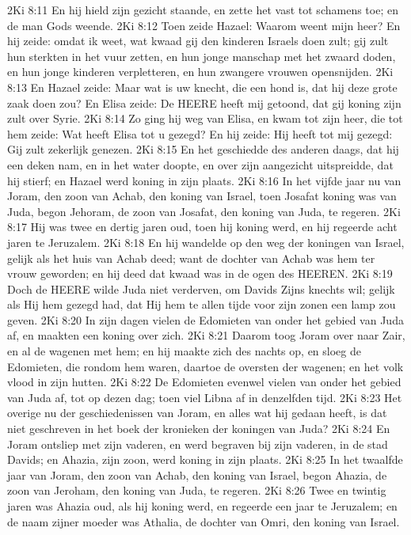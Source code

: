 2Ki 8:11  En hij hield zijn gezicht staande, en zette het vast tot schamens toe; en de man Gods weende.
2Ki 8:12  Toen zeide Hazael: Waarom weent mijn heer? En hij zeide: omdat ik weet, wat kwaad gij den kinderen Israels doen zult; gij zult hun sterkten in het vuur zetten, en hun jonge manschap met het zwaard doden, en hun jonge kinderen verpletteren, en hun zwangere vrouwen opensnijden.
2Ki 8:13  En Hazael zeide: Maar wat is uw knecht, die een hond is, dat hij deze grote zaak doen zou? En Elisa zeide: De HEERE heeft mij getoond, dat gij koning zijn zult over Syrie.
2Ki 8:14  Zo ging hij weg van Elisa, en kwam tot zijn heer, die tot hem zeide: Wat heeft Elisa tot u gezegd? En hij zeide: Hij heeft tot mij gezegd: Gij zult zekerlijk genezen.
2Ki 8:15  En het geschiedde des anderen daags, dat hij een deken nam, en in het water doopte, en over zijn aangezicht uitspreidde, dat hij stierf; en Hazael werd koning in zijn plaats.
2Ki 8:16  In het vijfde jaar nu van Joram, den zoon van Achab, den koning van Israel, toen Josafat koning was van Juda, begon Jehoram, de zoon van Josafat, den koning van Juda, te regeren.
2Ki 8:17  Hij was twee en dertig jaren oud, toen hij koning werd, en hij regeerde acht jaren te Jeruzalem.
2Ki 8:18  En hij wandelde op den weg der koningen van Israel, gelijk als het huis van Achab deed; want de dochter van Achab was hem ter vrouw geworden; en hij deed dat kwaad was in de ogen des HEEREN.
2Ki 8:19  Doch de HEERE wilde Juda niet verderven, om Davids Zijns knechts wil; gelijk als Hij hem gezegd had, dat Hij hem te allen tijde voor zijn zonen een lamp zou geven.
2Ki 8:20  In zijn dagen vielen de Edomieten van onder het gebied van Juda af, en maakten een koning over zich.
2Ki 8:21  Daarom toog Joram over naar Zair, en al de wagenen met hem; en hij maakte zich des nachts op, en sloeg de Edomieten, die rondom hem waren, daartoe de oversten der wagenen; en het volk vlood in zijn hutten.
2Ki 8:22  De Edomieten evenwel vielen van onder het gebied van Juda af, tot op dezen dag; toen viel Libna af in denzelfden tijd.
2Ki 8:23  Het overige nu der geschiedenissen van Joram, en alles wat hij gedaan heeft, is dat niet geschreven in het boek der kronieken der koningen van Juda?
2Ki 8:24  En Joram ontsliep met zijn vaderen, en werd begraven bij zijn vaderen, in de stad Davids; en Ahazia, zijn zoon, werd koning in zijn plaats.
2Ki 8:25  In het twaalfde jaar van Joram, den zoon van Achab, den koning van Israel, begon Ahazia, de zoon van Jeroham, den koning van Juda, te regeren.
2Ki 8:26  Twee en twintig jaren was Ahazia oud, als hij koning werd, en regeerde een jaar te Jeruzalem; en de naam zijner moeder was Athalia, de dochter van Omri, den koning van Israel.
